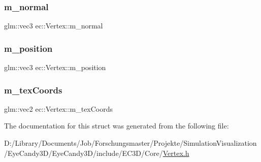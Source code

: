\subsubsection{\texorpdfstring{m\+\_\+normal}{m\_normal}}
{\footnotesize\ttfamily glm\+::vec3 ec\+::\+Vertex\+::m\+\_\+normal}

\mbox{\label{structec_1_1_vertex_acb3327c996406e4d1a6b43cfa1f3ea47}} 
\subsubsection{\texorpdfstring{m\+\_\+position}{m\_position}}
{\footnotesize\ttfamily glm\+::vec3 ec\+::\+Vertex\+::m\+\_\+position}

\mbox{\label{structec_1_1_vertex_a12e2b45d0fdb3873a01dd9ada9e66f64}} 
\subsubsection{\texorpdfstring{m\+\_\+tex\+Coords}{m\_texCoords}}
{\footnotesize\ttfamily glm\+::vec2 ec\+::\+Vertex\+::m\+\_\+tex\+Coords}



The documentation for this struct was generated from the following file\+:\begin{DoxyCompactItemize}
\item 
D\+:/\+Library/\+Documents/\+Job/\+Forschungsmaster/\+Projekte/\+Simulation\+Visualization/\+Eye\+Candy3\+D/\+Eye\+Candy3\+D/include/\+E\+C3\+D/\+Core/\mbox{\hyperlink{_vertex_8h}{Vertex.\+h}}\end{DoxyCompactItemize}
